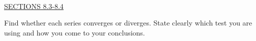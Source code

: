 \documentclass{exam}
\begin{document}
\begin{questions}
\begin{parts}
\end{parts}

\ \\
\underline{SECTIONS 8.3-8.4}

\question Find whether each series converges or diverges.  State clearly which test you are using and how you come to your conclusions.
\begin{parts}
\end{parts}
\end{questions}
\end{document}
